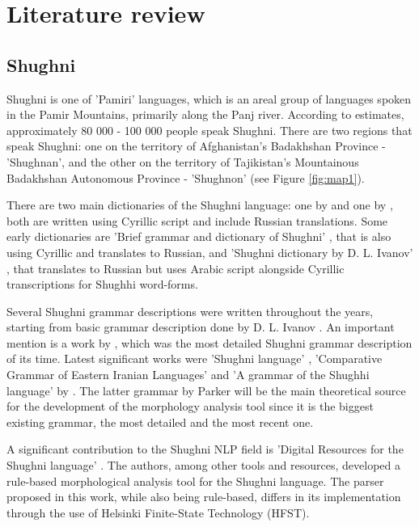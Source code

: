 \section{Literature review}
\subsection{Shughni}
\par Shughni is one of 'Pamiri' languages, which is an areal group of languages spoken in the Pamir Mountains, primarily along the Panj river. According to \textcite{edelman_dodykhudoeva_shughni_2009} estimates, approximately 80 000 - 100 000 people speak Shughni. There are two regions that speak Shughni: one on the territory of Afghanistan's Badakhshan Province - 'Shughnan', and the other on the territory of Tajikistan's Mountainous Badakhshan Autonomous Province - 'Shughnon' \parencite[2]{parker_shughni_2023} (see Figure \ref{fig:map1}).
\par There are two main dictionaries of the Shughni language: one by \textcite{zarubin_dict_1960} and one by \textcite{karamshoev_dict_1988}, both are written using Cyrillic script and include Russian translations. Some early dictionaries are 'Brief grammar and dictionary of Shughni' \parencite{tumanovich_gram_1906}, that is also using Cyrillic and translates to Russian, and 'Shughni dictionary by D. L. Ivanov' \parencite{salemann_dict_1895}, that translates to Russian but uses Arabic script alongside Cyrillic transcriptions for Shughhi word-forms.
\par Several Shughni grammar descriptions were written throughout the years, starting from basic grammar description done by D. L. Ivanov \parencite[274-281]{salemann_dict_1895}. An important mention is a work by \textcite{karamshoev_dialect_1963}, which was the most detailed Shughni grammar description of its time. Latest significant works were 'Shughni language' \parencite[225-242]{edelman_languages_1999}, 'Comparative Grammar of Eastern Iranian Languages' \parencite{edelman_gram_2009} and 'A grammar of the Shughhi language' by \textcite{parker_shughni_2023}. The latter grammar by Parker will be the main theoretical source for the development of the morphology analysis tool since it is the biggest existing grammar, the most detailed and the most recent one.
\par A significant contribution to the Shughni NLP field is 'Digital Resources for the Shughni language' \parencite{makarov_digital_2022}. The authors, among other tools and resources, developed a rule-based morphological analysis tool for the Shughni language. The parser proposed in this work, while also being rule-based, differs in its implementation through the use of Helsinki Finite-State Technology (HFST).

